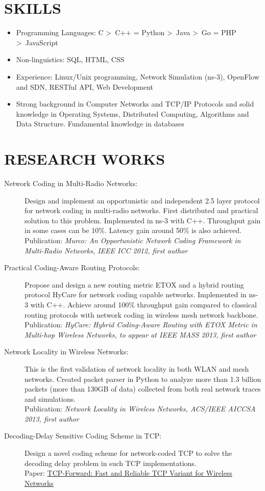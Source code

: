 \documentclass[line]{res}
\begin{document}
\begin{resume}
	\section{SKILLS}
	\begin{itemize}
		\item Programming Languages: C \textgreater \ C++ = Python \textgreater \ Java \textgreater \ Go = PHP \textgreater \ JavaScript
		\item Non-linguistics: SQL, HTML, CSS
		\item Experience: Linux/Unix programming, Network Simulation (ns-3), OpenFlow and SDN, RESTful API, Web Development
		\item Strong background in Computer Networks and TCP/IP Protocols and solid knowledge in Operating Systems, Distributed Computing, Algorithms and Data Structure. Fundamental knowledge in databases 
	\end{itemize}

	\section{RESEARCH WORKS}
	\begin{description}
		\item[Network Coding in Multi-Radio Networks:]
			Design and implement an opportunistic and independent 2.5 layer protocol for network coding in multi-radio networks. First distributed and practical solution to this problem. Implemented in ns-3 with C++. Throughput gain in some cases can be 10\%. Latency gain around 50\% is also achieved. \\
			Publication: \emph{Murco: An Opportunistic Network Coding Framework in Multi-Radio Networks, IEEE ICC 2012, first author}
		\item[Practical Coding-Aware Routing Protocols:]
			Propose and design a new routing metric ETOX and a hybrid routing protocol HyCare for network coding capable networks. Implemented in ns-3 with C++. Achieve around 100\% throughput gain compared to classical routing protocols with network coding in wireless mesh network backbone.\\
			Publication: \emph{HyCare: Hybrid Coding-Aware Routing with ETOX Metric in Multi-hop Wireless Networks, to appear at IEEE MASS 2013, first author}
		\item[Network Locality in Wireless Networks:]
			This is the first validation of network locality in both WLAN and mesh networks. Created packet parser in Python to analyze more than 1.3 billion packets (more than 130GB of data) collected from both real network traces and simulations. \\
			Publication: \emph{Network Locality in Wireless Networks, ACS/IEEE AICCSA 2013, first author}
		\item [Decoding-Delay Sensitive Coding Scheme in TCP:]
			Design a novel coding scheme for network-coded TCP to solve the decoding delay problem in such TCP implementations. \\
			Paper: \href{http://arxiv.org/abs/1408.2626}{TCP-Forward: Fast and Reliable TCP Variant for Wireless Networks}
	\end{description}
	

\end{resume}
\end{document}
